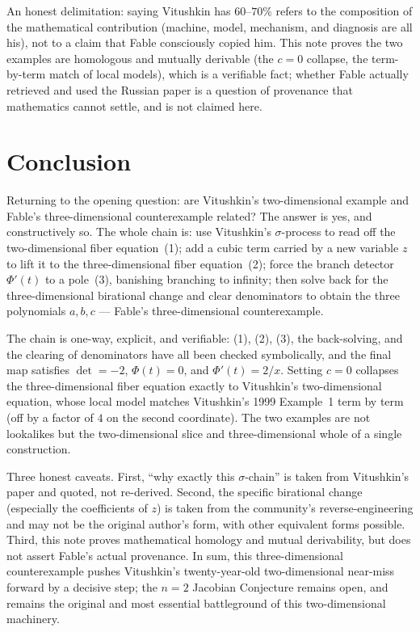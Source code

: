 \documentclass[11pt]{article}
\theoremstyle{plain}
\theoremstyle{definition}
\begin{document}
An honest delimitation: saying Vitushkin has $60$--$70\%$ refers to the
composition of the mathematical contribution (machine, model, mechanism, and
diagnosis are all his), not to a claim that Fable consciously copied him.
This note proves the two examples are homologous and mutually derivable (the
$c=0$ collapse, the term-by-term match of local models), which is a
verifiable fact; whether Fable actually retrieved and used the Russian paper
is a question of provenance that mathematics cannot settle, and is not
claimed here.

\section*{Conclusion}
Returning to the opening question: are Vitushkin's two-dimensional example
and Fable's three-dimensional counterexample related? The answer is yes, and
constructively so. The whole chain is: use Vitushkin's $\sigma$-process to
read off the two-dimensional fiber equation~(1); add a cubic term carried by
a new variable $z$ to lift it to the three-dimensional fiber equation~(2);
force the branch detector $\Phi'(t)$ to a pole~(3), banishing branching to
infinity; then solve back for the three-dimensional birational change and
clear denominators to obtain the three polynomials $a,b,c$ --- Fable's
three-dimensional counterexample.

The chain is one-way, explicit, and verifiable: (1), (2), (3), the
back-solving, and the clearing of denominators have all been checked
symbolically, and the final map satisfies $\det=-2$, $\Phi(t)=0$, and
$\Phi'(t)=2/x$. Setting $c=0$ collapses the three-dimensional fiber equation
exactly to Vitushkin's two-dimensional equation, whose local model matches
Vitushkin's 1999 Example~1 term by term (off by a factor of $4$ on the second
coordinate). The two examples are not lookalikes but the two-dimensional
slice and three-dimensional whole of a single construction.

Three honest caveats. First, ``why exactly this $\sigma$-chain'' is taken
from Vitushkin's paper and quoted, not re-derived. Second, the specific
birational change (especially the coefficients of $z$) is taken from the
community's reverse-engineering and may not be the original author's form,
with other equivalent forms possible. Third, this note proves mathematical
homology and mutual derivability, but does not assert Fable's actual
provenance. In sum, this three-dimensional counterexample pushes Vitushkin's
twenty-year-old two-dimensional near-miss forward by a decisive step; the
$n=2$ Jacobian Conjecture remains open, and remains the original and most
essential battleground of this two-dimensional machinery.
\end{document}
